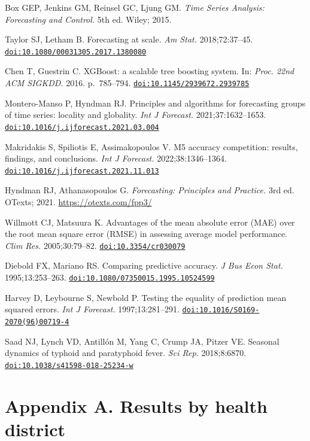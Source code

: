 \documentclass[11pt]{article}
\begin{document}
\begin{enumerate}[label={[\arabic*]},leftmargin=2.2em,itemsep=0.5pt]
\item\hypertarget{ref18}{}Box GEP, Jenkins GM, Reinsel GC, Ljung GM. \textit{Time Series Analysis: Forecasting and Control.} 5th ed. Wiley; 2015.
\item\hypertarget{ref19}{}Taylor SJ, Letham B. Forecasting at scale. \textit{Am Stat.} 2018;72:37--45. \href{https://doi.org/10.1080/00031305.2017.1380080}{\nolinkurl{doi:10.1080/00031305.2017.1380080}}
\item\hypertarget{ref20}{}Chen T, Guestrin C. XGBoost: a scalable tree boosting system. In: \textit{Proc. 22nd ACM SIGKDD.} 2016. p.~785--794. \href{https://doi.org/10.1145/2939672.2939785}{\nolinkurl{doi:10.1145/2939672.2939785}}
\item\hypertarget{ref21}{}Montero-Manso P, Hyndman RJ. Principles and algorithms for forecasting groups of time series: locality and globality. \textit{Int J Forecast.} 2021;37:1632--1653. \href{https://doi.org/10.1016/j.ijforecast.2021.03.004}{\nolinkurl{doi:10.1016/j.ijforecast.2021.03.004}}
\item\hypertarget{ref22}{}Makridakis S, Spiliotis E, Assimakopoulos V. M5 accuracy competition: results, findings, and conclusions. \textit{Int J Forecast.} 2022;38:1346--1364. \href{https://doi.org/10.1016/j.ijforecast.2021.11.013}{\nolinkurl{doi:10.1016/j.ijforecast.2021.11.013}}
\item\hypertarget{ref23}{}Hyndman RJ, Athanasopoulos G. \textit{Forecasting: Principles and Practice.} 3rd ed. OTexts; 2021. \url{https://otexts.com/fpp3/}
\item\hypertarget{ref24}{}Willmott CJ, Matsuura K. Advantages of the mean absolute error (MAE) over the root mean square error (RMSE) in assessing average model performance. \textit{Clim Res.} 2005;30:79--82. \href{https://doi.org/10.3354/cr030079}{\nolinkurl{doi:10.3354/cr030079}}
\item\hypertarget{ref25}{}Diebold FX, Mariano RS. Comparing predictive accuracy. \textit{J Bus Econ Stat.} 1995;13:253--263. \href{https://doi.org/10.1080/07350015.1995.10524599}{\nolinkurl{doi:10.1080/07350015.1995.10524599}}
\item\hypertarget{ref26}{}Harvey D, Leybourne S, Newbold P. Testing the equality of prediction mean squared errors. \textit{Int J Forecast.} 1997;13:281--291. \href{https://doi.org/10.1016/S0169-2070(96)00719-4}{\nolinkurl{doi:10.1016/S0169-2070(96)00719-4}}
\item\hypertarget{ref27}{}Saad NJ, Lynch VD, Antillón M, Yang C, Crump JA, Pitzer VE. Seasonal dynamics of typhoid and paratyphoid fever. \textit{Sci Rep.} 2018;8:6870. \href{https://doi.org/10.1038/s41598-018-25234-w}{\nolinkurl{doi:10.1038/s41598-018-25234-w}}
\end{enumerate}

\normalsize
\section*{Appendix A. Results by health district}

\end{document}
